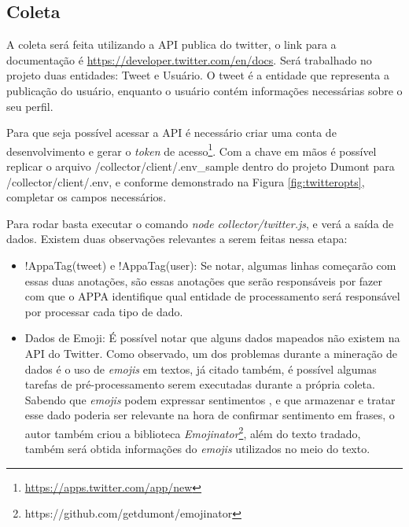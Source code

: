 \subsection{Coleta}
A coleta será feita utilizando a API publica do twitter, o link para a documentação é \url{https://developer.twitter.com/en/docs}. Será trabalhado no projeto duas entidades: Tweet e Usuário. O tweet é a entidade que representa a publicação do usuário, enquanto o usuário contém informações necessárias sobre o seu perfil.

Para que seja possível acessar a API é necessário criar uma conta de desenvolvimento e gerar o \textit{token} de acesso\footnote{\url{https://apps.twitter.com/app/new}}. Com a chave em mãos é possível replicar o arquivo /collector/client/.env\_sample dentro do projeto Dumont para /collector/client/.env, e conforme demonstrado na Figura \ref{fig:twitteropts}, completar os campos necessários.

Para rodar basta executar o comando \textit{node collector/twitter.js}, e verá a saída de dados. Existem duas observações relevantes a serem feitas nessa etapa:
\begin{itemize}
  \item !AppaTag(tweet) e !AppaTag(user): Se notar, algumas linhas começarão com essas duas anotações, são essas anotações que serão responsáveis por fazer com que o APPA identifique qual entidade de processamento será responsável por processar cada tipo de dado.
  \item Dados de Emoji: É possível notar que alguns dados mapeados não existem na API do Twitter. Como observado, um dos problemas durante a mineração de dados é o uso de \textit{emojis} em textos, já citado também, é possível algumas tarefas de pré-processamento serem executadas durante a própria coleta. Sabendo que \textit{emojis} podem expressar sentimentos \cite{novak2015sentiment}, e que armazenar e tratar esse dado poderia ser relevante na hora de confirmar sentimento em frases, o autor também criou a biblioteca \textit{Emojinator}\footnote{https://github.com/getdumont/emojinator}, além do texto tradado, também será obtida informações do \textit{emojis} utilizados no meio do texto.
\end{itemize}

